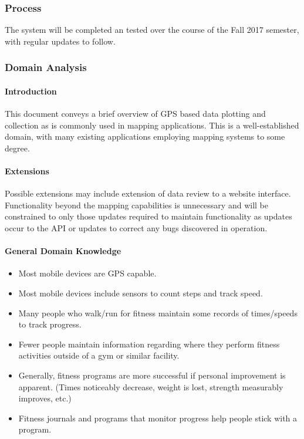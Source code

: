 ﻿\documentclass{article}
\begin{document}
\subsubsection{Process}
The system will be completed an tested over the course of the Fall 2017 semester, with regular updates to follow.

\subsubsection{Domain Analysis}
\paragraph{Introduction}
This document conveys a brief overview of GPS based data plotting and collection as is commonly used in mapping applications. This is a well-established domain, with many existing applications employing mapping systems to some degree.

\paragraph{Extensions}
Possible extensions may include extension of data review to a website interface. Functionality beyond the mapping capabilities is unnecessary and will be constrained to only those updates required to maintain functionality as updates occur to the API or updates to correct any bugs discovered in operation.

\paragraph{General Domain Knowledge}
\begin{itemize}
    \item  Most mobile devices are GPS capable.
    \item Most mobile devices include sensors to count steps and track speed.
    \item Many people who walk/run for fitness maintain some records of times/speeds to track progress.
    \item Fewer people maintain information regarding where they perform fitness activities outside of a gym or similar facility.
    \item Generally, fitness programs are more successful if personal improvement is apparent. (Times noticeably decrease, weight is lost, strength measurably improves, etc.)
    \item Fitness journals and programs that monitor progress help people stick with a program.
\end{itemize}
\end{document}
